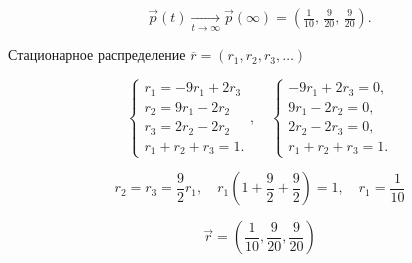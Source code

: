\[
	\vec{p}(t)\xrightarrow [t\to\infty]{}\vec{p}(\infty)=\left(\tfrac{1}{10},\,\tfrac{9}{20},\,\tfrac{9}{20}\right).
\]

Стационарное распределение $\overline r=(r_1,r_2,r_3,\ldots)$

\[
	\begin{cases}
		r_1 = -9 r_1 + 2 r_3 \\
		r_2 = 9 r_1 -2 r_2   \\
		r_3 = 2 r_2 -2 r_2   \\
		r_1 + r_2 + r_3 = 1.
	\end{cases}
	, \quad
	\begin{cases}
		-9r_1 + 2r_3 = 0, \\
		9r_1 - 2r_2 = 0,  \\
		2r_2 - 2r_3 = 0,  \\
		r_1 + r_2 + r_3 = 1.
	\end{cases}
\]

\[
	r_2=r_3=\frac{9}{2}r_1
	, \quad
	r_1(1+\frac{9}{2}+\frac{9}{2})=1
	, \quad
	r_1=\frac{1}{10}
\]

\[
	\vec r = (\frac{1}{10}, \frac{9}{20}, \frac{9}{20})
\]